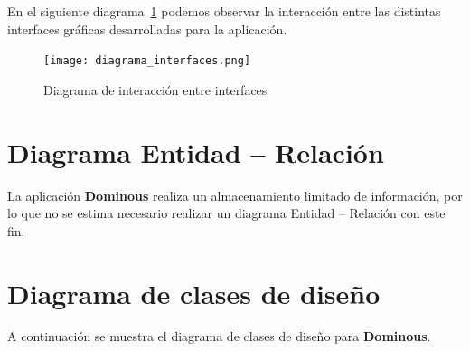 En el siguiente diagrama~\ref{fig:diagramainteraccioninterfaces} podemos observar la interacción entre
las distintas interfaces gráficas desarrolladas para la aplicación. \\

\begin{figure}[h]
  \label{fig:diagramainteraccioninterfaces}
  \begin{center}
    \texttt{[image: diagrama\_interfaces.png]}
  \end{center}
  \caption{Diagrama de interacción entre interfaces}
\end{figure}

\section{Diagrama Entidad -- Relación}

La aplicación \textbf{Dominous} realiza un almacenamiento limitado de información, por lo que no se estima necesario
realizar un diagrama Entidad -- Relación con este fin.

\section{Diagrama de clases de diseño}

A continuación se muestra el diagrama de clases de diseño para \textbf{Dominous}.

